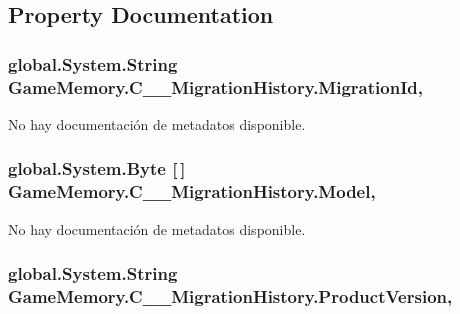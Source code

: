 \subsection{Property Documentation}
\hypertarget{class_game_memory_1_1_c_____migration_history_aa3b7056950a36d9f1beec90a885528d6}{
\subsubsection[{Migration\-Id}]{\setlength{\rightskip}{0pt plus 5cm}global.\-System.\-String Game\-Memory.\-C\-\_\-\-\_\-\-Migration\-History.\-Migration\-Id\hspace{0.3cm}{\ttfamily [get]}, {\ttfamily [set]}}}\label{class_game_memory_1_1_c_____migration_history_aa3b7056950a36d9f1beec90a885528d6}


No hay documentación de metadatos disponible. 

\hypertarget{class_game_memory_1_1_c_____migration_history_a58891e2fdcbaa080ac0552ececafc6e9}{
\subsubsection[{Model}]{\setlength{\rightskip}{0pt plus 5cm}global.\-System.\-Byte \mbox{[}$\,$\mbox{]} Game\-Memory.\-C\-\_\-\-\_\-\-Migration\-History.\-Model\hspace{0.3cm}{\ttfamily [get]}, {\ttfamily [set]}}}\label{class_game_memory_1_1_c_____migration_history_a58891e2fdcbaa080ac0552ececafc6e9}


No hay documentación de metadatos disponible. 

\hypertarget{class_game_memory_1_1_c_____migration_history_a0ed9c308a2f2cb884bf4ed841e400093}{
\subsubsection[{Product\-Version}]{\setlength{\rightskip}{0pt plus 5cm}global.\-System.\-String Game\-Memory.\-C\-\_\-\-\_\-\-Migration\-History.\-Product\-Version\hspace{0.3cm}{\ttfamily [get]}, {\ttfamily [set]}}}\label{class_game_memory_1_1_c_____migration_history_a0ed9c308a2f2cb884bf4ed841e400093}



